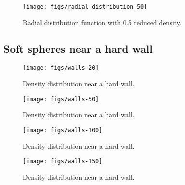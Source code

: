 \documentclass[letterpaper,twocolumn,amsmath,amssymb,prb]{revtex4-1}
\begin{document}
\begin{figure}
\begin{center}
\texttt{[image: figs/radial-distribution-50]}
\end{center}
\caption{Radial distribution function with 0.5 reduced density.}
\label{fig:radial-distribution-50}
\end{figure}


\subsection{Soft spheres near a hard wall}

\begin{figure}
\begin{center}
\texttt{[image: figs/walls-20]}
\end{center}
\caption{Density distribution near a hard wall.}
\label{fig:walls-20}
\end{figure}

\begin{figure}
\begin{center}
\texttt{[image: figs/walls-50]}
\end{center}
\caption{Density distribution near a hard wall.}
\label{fig:walls-50}
\end{figure}

\begin{figure}
\begin{center}
\texttt{[image: figs/walls-100]}
\end{center}
\caption{Density distribution near a hard wall.}
\label{fig:walls-100}
\end{figure}

\begin{figure}
\begin{center}
\texttt{[image: figs/walls-150]}
\end{center}
\caption{Density distribution near a hard wall.}
\label{fig:walls-150}
\end{figure}

\end{document}
